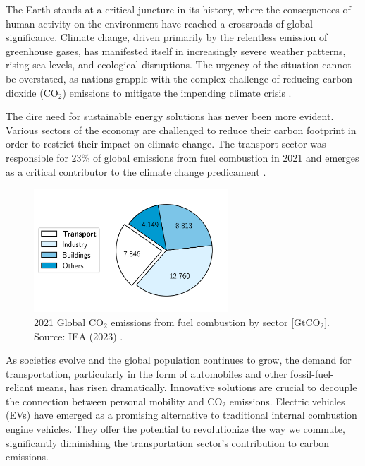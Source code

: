 The Earth stands at a critical juncture in its history, where the consequences of human activity on the environment have reached a crossroads of global significance. Climate change, driven primarily by the relentless emission of greenhouse gases, has manifested itself in increasingly severe weather patterns, rising sea levels, and ecological disruptions. The urgency of the situation cannot be overstated, as nations grapple with the complex challenge of reducing carbon dioxide (CO$_2$) emissions to mitigate the impending climate crisis \cite{solomon2009irreversible,noaa-co2,world2016ambient}. 

The dire need for sustainable energy solutions has never been more evident. Various sectors of the economy are challenged to reduce their carbon footprint in order to restrict their impact on climate change. The transport sector was responsible for 23\% of global emissions from fuel combustion in 2021 and emerges as a critical contributor to the climate change predicament \cite{iea-transport}. 

\begin{figure}[h]
    \centering
    \includegraphics[width=0.65\textwidth]{Images/Chapter1/iea-transport2.png}
    \caption[2021 Global CO$_2$ emissions from fuel combustion by sector]{2021 Global CO$_2$ emissions from fuel combustion by sector [$\text{GtCO}_2$]. Source: IEA (2023) \cite{iea-transport}.}
    \label{fig:iea-transport}
\end{figure}

As societies evolve and the global population continues to grow, the demand for transportation, particularly in the form of automobiles and other fossil-fuel-reliant means, has risen dramatically. Innovative solutions are crucial to decouple the connection between personal mobility and CO$_2$ emissions. Electric vehicles (EVs) have emerged as a promising alternative to traditional internal combustion engine vehicles. They offer the potential to revolutionize the way we commute, significantly diminishing the transportation sector's contribution to carbon emissions. 

